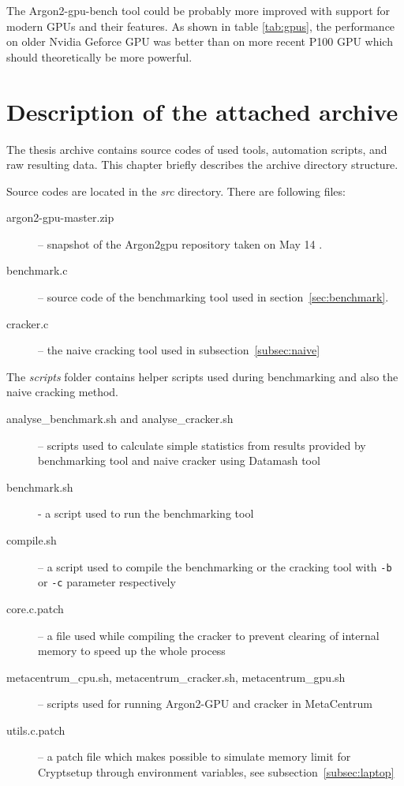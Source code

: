 \documentclass[nolof,digital]{fithesis3}
\begin{document}
The Argon2-gpu-bench tool could be probably more improved with support for modern GPUs and their features. As shown in table \ref{tab:gpus}, the performance on older Nvidia Geforce GPU was better than on more recent P100 GPU which should theoretically be more powerful.

\printbibliography
\appendix
\chapter{Description of the attached archive}
The thesis archive contains source codes of used tools, automation scripts, and raw resulting data. This chapter briefly describes the archive directory structure.

Source codes are located in the \emph{src} directory. There are following files:

\begin{description}
\item[argon2-gpu-master.zip] -- snapshot of the Argon2gpu repository taken on May 14 \parencite{argon2gpuvojta}.

\item[benchmark.c] -- source code of the benchmarking tool used in section~\ref{sec:benchmark}.

\item[cracker.c] -- the naive cracking tool used in subsection~\ref{subsec:naive}
\end{description}

The \emph{scripts} folder contains helper scripts used during benchmarking and also the naive cracking method.

\begin{description}
\item[analyse\_benchmark.sh and analyse\_cracker.sh] -- scripts used to calculate simple statistics from results provided by benchmarking tool and naive cracker using Datamash tool

\item[benchmark.sh]  - a script used to run the benchmarking tool

\item[compile.sh] -- a script used to compile the benchmarking or the cracking tool with \verb+-b+ or \verb+-c+ parameter respectively

\item[core.c.patch] -- a file used while compiling the cracker to prevent clearing of internal memory to speed up the whole process

\item[metacentrum\_cpu.sh, metacentrum\_cracker.sh, metacentrum\_gpu.sh] -- scripts used for running Argon2-GPU and cracker in MetaCentrum

\item[utils.c.patch] -- a patch file which makes possible to simulate memory limit for Cryptsetup through environment variables, see subsection~\ref{subsec:laptop}
\end{description}
\end{document}
